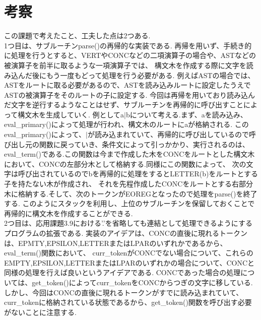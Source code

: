 \documentclass{jsarticle}
\theoremstyle{plain}
\begin{document}
\section{考察}
この課題で考えたこと、工夫した点は2つある. \\
1つ目は、サブルーチンparse()の再帰的な実装である.
再帰を用いず、手続き的に処理を行うとすると、VERTやCONCなどの二項演算子の場合や、ASTなどの被演算子を前半に取るような一項演算子では、
構文木を作成する際に文字を読み込んだ後にもう一度もどって処理を行う必要がある.
例えばASTの場合では、ASTをルートに取る必要があるので、ASTを読み込みルートに設定したうえでASTの被演算子をそのルートの子に設定する.
今回は再帰を用いており読み込んだ文字を逆行するようなことはせず、サブルーチンを再帰的に呼び出すことによって構文木を生成していく.
例としてa$|$bについて考える.まず、aを読み込み、eval\_primary()によって処理が行われ、構文木のルートにaが格納される.
このeval\_primary()によって、$|$が読み込まれていて、再帰的に呼び出しているので呼び出し元の関数に戻っていき、条件文によって引っかかり、実行されるのは、
eval\_term()である.この関数は今まで作成した木をCONCをルートとした構文木において、CONCの左部分木として格納する.同様にこの関数によって、
次の文字は呼び出されているのでbを再帰的に処理をするとLETTER(b)をルートとする子を持たない木が作成され、
それを先程作成したCONCをルートとする右部分木に格納する.そして、次のトークンがEOREGとなったので処理をparse()を終了する.
このようにスタックを利用し、上位のサブルーチンを保留しておくことで再帰的に構文木を作成することができる. \\
2つ目は、応用課題3.9における'.'を省略しても連結として処理できるようにするプログラムの拡張である.
実装のアイデアは、CONCの直後に現れるトークンは、EPMTY,EPSILON,LETTERまたはLPARのいずれかであるから、eval\_term()関数において、
curr\_tokenがCONCでない場合について、これらのEMPTY,EPSILON,LETTERまたはLPARのいずれかの場合について、CONCと同様の処理を行えば良いというアイデアである.
CONCであった場合の処理については、get\_token()によってcurr\_tokenをCONCからつぎの文字に移している.しかし、今回はCONCの直後に現れるトークンがすでに読み込まれていて、
curr\_tokenに格納されている状態であるから、get\_token()関数を呼び出す必要がないことに注意する.
\end{document}
